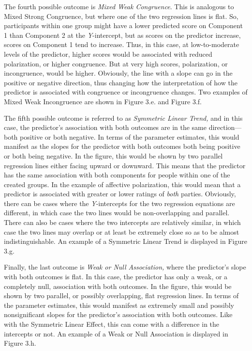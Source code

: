 \documentclass[authordate, meta, issue]{jote-new-article}
\begin{document}
	The fourth possible outcome is \emph{Mixed Weak Congruence}. This is analogous to Mixed Strong Congruence, but where one of the two regression lines is flat. So, participants within one group might have a lower predicted score on Component 1 than Component 2 at the \emph{Y}-intercept, but as scores on the predictor increase, scores on Component 1 tend to increase. Thus, in this case, at low-to-moderate levels of the predictor, higher scores would be associated with reduced polarization, or higher congruence. But at very high scores, polarization, or incongruence, would be higher. Obviously, the line with a slope can go in the positive or negative direction, thus changing how the interpretation of how the predictor is associated with congruence or incongruence changes. Two examples of Mixed Weak Incongruence are shown in Figure 3.e. and Figure 3.f.



	The fifth possible outcome is referred to as \emph{Symmetric Linear Trend, }and in this case, the predictor's association with both outcomes are in the same direction—both positive or both negative. In terms of the parameter estimates, this would manifest as the slopes for the predictor with both outcomes both being positive or both being negative. In the figure, this would be shown by two parallel regression lines either facing upward or downward. This means that the predictor has the same association with both components for people within one of the created groups. In the example of affective polarization, this would mean that a predictor is associated with greater or lower ratings of \emph{both }parties. Obviously, there can be cases where the \emph{Y}-intercepts for the two regression equations are different, in which case the two lines would be non-overlapping and parallel. There can also be cases where the two intercepts are relatively similar, in which case the two lines may overlap or at least be extremely close so as to be almost indistinguishable. An example of a Symmetric Linear Trend is displayed in Figure 3.g.
	
	Finally, the last outcome is \emph{Weak or Null Association, }where the predictor's slope with both outcomes is flat. In this case, the predictor has only a weak, or a completely null, association with both outcomes. In the figure, this would be shown by two parallel, or possibly overlapping, flat regression lines. In terms of the parameter estimates, this would manifest as extremely small and possibly nonsignificant slopes for the predictor's association with both outcomes. Like with the Symmetric Linear Effect, this can come with a difference in the intercepts or not. An example of a Weak or Null Association is displayed in Figure 3.h.
\end{document}
